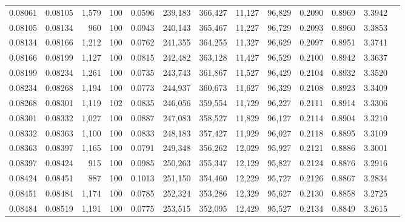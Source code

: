 \begin{tabular}{rrrrrrrrrrrrr}
0.08061 & 0.08105 & 1,579 & 100 &                                     0.0596 & 239,183 & 366,427 &  11,127 &  96,829 & 0.2090 & 0.8969 & 3.3942 \\
0.08105 & 0.08134 &   960 & 100 &                                     0.0943 & 240,143 & 365,467 &  11,227 &  96,729 & 0.2093 & 0.8960 & 3.3853 \\
0.08134 & 0.08166 & 1,212 & 100 &                                     0.0762 & 241,355 & 364,255 &  11,327 &  96,629 & 0.2097 & 0.8951 & 3.3741 \\
0.08166 & 0.08199 & 1,127 & 100 &                                     0.0815 & 242,482 & 363,128 &  11,427 &  96,529 & 0.2100 & 0.8942 & 3.3637 \\
0.08199 & 0.08234 & 1,261 & 100 &                                     0.0735 & 243,743 & 361,867 &  11,527 &  96,429 & 0.2104 & 0.8932 & 3.3520 \\
0.08234 & 0.08268 & 1,194 & 100 &                                     0.0773 & 244,937 & 360,673 &  11,627 &  96,329 & 0.2108 & 0.8923 & 3.3409 \\
0.08268 & 0.08301 & 1,119 & 102 &                                     0.0835 & 246,056 & 359,554 &  11,729 &  96,227 & 0.2111 & 0.8914 & 3.3306 \\
0.08301 & 0.08332 & 1,027 & 100 &                                     0.0887 & 247,083 & 358,527 &  11,829 &  96,127 & 0.2114 & 0.8904 & 3.3210 \\
0.08332 & 0.08363 & 1,100 & 100 &                                     0.0833 & 248,183 & 357,427 &  11,929 &  96,027 & 0.2118 & 0.8895 & 3.3109 \\
0.08363 & 0.08397 & 1,165 & 100 &                                     0.0791 & 249,348 & 356,262 &  12,029 &  95,927 & 0.2121 & 0.8886 & 3.3001 \\
0.08397 & 0.08424 &   915 & 100 &                                     0.0985 & 250,263 & 355,347 &  12,129 &  95,827 & 0.2124 & 0.8876 & 3.2916 \\
0.08424 & 0.08451 &   887 & 100 &                                     0.1013 & 251,150 & 354,460 &  12,229 &  95,727 & 0.2126 & 0.8867 & 3.2834 \\
0.08451 & 0.08484 & 1,174 & 100 &                                     0.0785 & 252,324 & 353,286 &  12,329 &  95,627 & 0.2130 & 0.8858 & 3.2725 \\
0.08484 & 0.08519 & 1,191 & 100 &                                     0.0775 & 253,515 & 352,095 &  12,429 &  95,527 & 0.2134 & 0.8849 & 3.2615 \\

\end{tabular}
